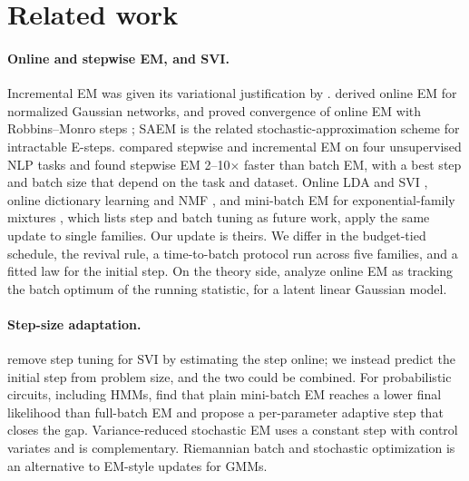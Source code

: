 \documentclass[10pt]{article}
\begin{document}
\section{Related work}

\paragraph{Online and stepwise EM, and SVI.} Incremental EM was given its variational justification by
\citet{neal1998view}. \citet{sato2000online} derived online EM for normalized Gaussian networks, and
\citet{cappe2009online} proved convergence of online EM with Robbins--Monro steps \citep{robbins1951stochastic}; SAEM
\citep{delyon1999saem} is the related stochastic-approximation scheme for intractable E-steps. \citet{liang2009online}
compared stepwise and incremental EM on four unsupervised NLP tasks and found stepwise EM 2--10$\times$ faster than
batch EM, with a best step and batch size that depend on the task and dataset. Online LDA and SVI \citep{hoffman2010online,hoffman2013svi}, online dictionary learning
and NMF \citep{mairal2010online}, and mini-batch EM for exponential-family mixtures \citep{nguyen2020minibatch}, which
lists step and batch tuning as future work, apply the same update to single families. Our update is theirs. We
differ in the budget-tied schedule, the revival rule, a time-to-batch protocol run across five families, and a
fitted law for the initial step. On the theory side, \citet{li2026equilibrium} analyze online EM as tracking the batch
optimum of the running statistic, for a latent linear Gaussian model.

\paragraph{Step-size adaptation.} \citet{ranganath2013adaptive} remove step tuning for SVI by estimating the step
online; we instead predict the initial step from problem size, and the two could be combined. For probabilistic
circuits, including HMMs, \citet{liu2025anemone} find that plain mini-batch EM reaches a lower final likelihood
than full-batch EM and propose a per-parameter adaptive step that closes the gap. Variance-reduced
stochastic EM \citep{chen2018sem} uses a constant step with control variates and is complementary. Riemannian batch
and stochastic optimization \citep{hosseini2020alternative} is an alternative to EM-style updates for GMMs.
\end{document}
